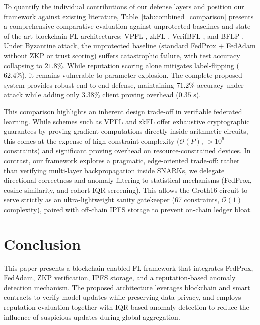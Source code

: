 \documentclass[conference, a4paper]{IEEEtran}
\begin{document}
To quantify the individual contributions of our defense layers and position our framework against existing literature, Table~\ref{tab:combined_comparison} presents a comprehensive comparative evaluation against unprotected baselines and state-of-the-art blockchain-FL architectures: VPFL \cite{ma2024vpfl}, zkFL \cite{wang2025zkfl}, VerifBFL \cite{bellachia2025verifbfl}, and BFLP \cite{li2026bflp}. Under Byzantine attack, the unprotected baseline (standard FedProx + FedAdam without ZKP or trust scoring) suffers catastrophic failure, with test accuracy collapsing to $21.8\%$. While reputation scoring alone mitigates label-flipping ($62.4\%$), it remains vulnerable to parameter explosion. The complete proposed system provides robust end-to-end defense, maintaining $71.2\%$ accuracy under attack while adding only $3.38\%$ client proving overhead ($0.35\text{ s}$).

This comparison highlights an inherent design trade-off in verifiable federated learning. While schemes such as VPFL \cite{ma2024vpfl} and zkFL \cite{wang2025zkfl} offer exhaustive cryptographic guarantees by proving gradient computations directly inside arithmetic circuits, this comes at the expense of high constraint complexity ($\mathcal{O}(P)$, $>10^6$ constraints) and significant proving overhead on resource-constrained devices. In contrast, our framework explores a pragmatic, edge-oriented trade-off: rather than verifying multi-layer backpropagation inside SNARKs, we delegate directional correctness and anomaly filtering to statistical mechanisms (FedProx, cosine similarity, and cohort IQR screening). This allows the Groth16 circuit to serve strictly as an ultra-lightweight sanity gatekeeper (67 constraints, $\mathcal{O}(1)$ complexity), paired with off-chain IPFS storage to prevent on-chain ledger bloat.




\section{Conclusion}\label{Conclusion}

This paper presents a blockchain-enabled FL framework that integrates FedProx, FedAdam, ZKP verification, IPFS storage, and a reputation-based anomaly detection mechanism. The proposed architecture leverages blockchain and smart contracts to verify model updates while preserving data privacy, and employs reputation evaluation together with IQR-based anomaly detection to reduce the influence of suspicious updates during global aggregation.
\end{document}
